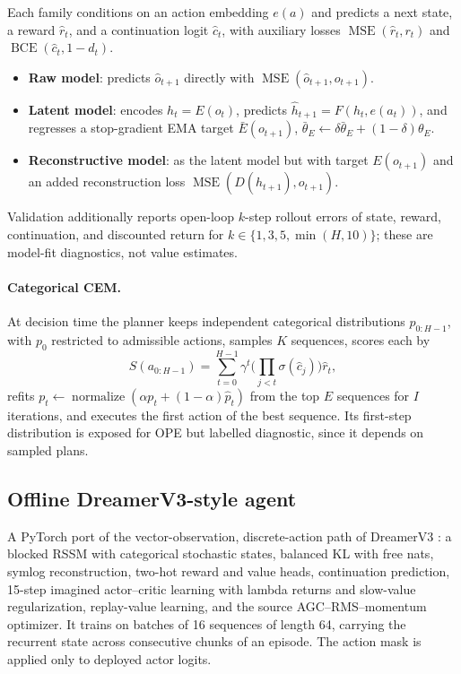 \documentclass[10pt,twocolumn]{article}
\begin{document}
Each family conditions on an action embedding $e(a)$ and predicts a next state, a reward $\hat r_t$, and a continuation logit $\hat c_t$, with auxiliary losses $\operatorname{MSE}(\hat r_t,r_t)$ and $\operatorname{BCE}(\hat c_t,1-d_t)$.
\begin{itemize}
    \item \textbf{Raw model}: predicts $\hat o_{t+1}$ directly with $\operatorname{MSE}(\hat o_{t+1},o_{t+1})$.
    \item \textbf{Latent model}: encodes $h_t=E(o_t)$, predicts $\hat h_{t+1}=F(h_t,e(a_t))$, and regresses a stop-gradient EMA target $\bar E(o_{t+1})$, $\bar\theta_E\leftarrow\delta\bar\theta_E+(1-\delta)\theta_E$.
    \item \textbf{Reconstructive model}: as the latent model but with target $E(o_{t+1})$ and an added reconstruction loss $\operatorname{MSE}(D(\hat h_{t+1}),o_{t+1})$.
\end{itemize}
Validation additionally reports open-loop $k$-step rollout errors of state, reward, continuation, and discounted return for $k\in\{1,3,5,\min(H,10)\}$; these are model-fit diagnostics, not value estimates.

\paragraph{Categorical CEM.} At decision time the planner keeps independent categorical distributions $p_{0:H-1}$, with $p_0$ restricted to admissible actions, samples $K$ sequences, scores each by
\begin{equation}
 S(a_{0:H-1})=\sum_{t=0}^{H-1}\gamma^t\Big(\prod_{j<t}\sigma(\hat c_j)\Big)\hat r_t,
\end{equation}
refits $p_t\leftarrow\operatorname{normalize}(\alpha p_t+(1-\alpha)\hat p_t)$ from the top $E$ sequences for $I$ iterations, and executes the first action of the best sequence. Its first-step distribution is exposed for OPE but labelled diagnostic, since it depends on sampled plans.

\subsection{Offline DreamerV3-style agent}
\label{sec:dreamer}

A PyTorch port of the vector-observation, discrete-action path of DreamerV3 \cite{hafner2023dreamerv3}: a blocked RSSM with categorical stochastic states, balanced KL with free nats, symlog reconstruction, two-hot reward and value heads, continuation prediction, 15-step imagined actor--critic learning with lambda returns and slow-value regularization, replay-value learning, and the source AGC--RMS--momentum optimizer. It trains on batches of 16 sequences of length 64, carrying the recurrent state across consecutive chunks of an episode. The action mask is applied only to deployed actor logits.
\end{document}
